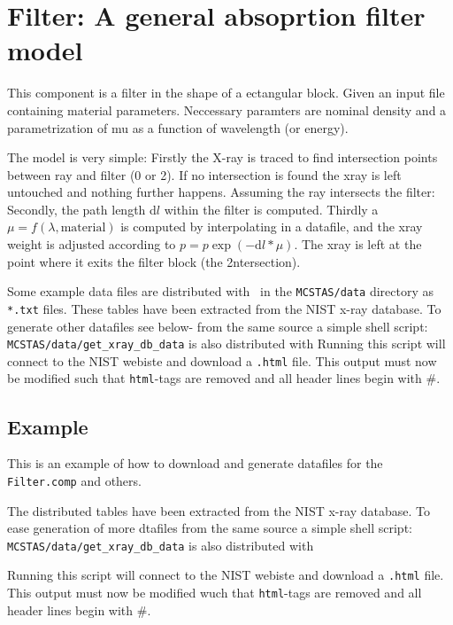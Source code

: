 \section{Filter: A general absoprtion filter model}
\label{filter}


This component is a filter in the shape of a ectangular block. Given an input file containing material parameters.
Neccessary paramters are nominal density and a parametrization of mu as a function of wavelength (or energy).

The model is very simple: Firstly the X-ray is traced to find intersection points between ray and filter (0 or 2).
If no intersection is found the xray is left untouched and nothing further happens.
Assuming the ray intersects the filter: Secondly, the path length d$l$ within the filter is computed.
Thirdly a $\mu = f(\lambda,\mathrm{material})$ is computed by interpolating in a datafile, and the xray weight is adjusted according to $p=p\exp(-\mathrm{d}l*\mu)$. The xray is left at the point where it exits the filter block (the 2\nd ntersection).

Some example data files are distributed with \MCX\ in the
\verb+MCSTAS/data+ directory as \verb+*.txt+ files. These tables have been extracted from the NIST x-ray database.
To generate other datafiles see below-
from the same source a simple shell script: \verb+MCSTAS/data/get_xray_db_data+ is also distributed with \MCX
Running this script will connect to the NIST webiste and download a \verb+.html+ file. This output must now be modified such that \verb+html+-tags
are removed and all header lines begin with #.

\subsection{Example}
\label{getNISTdata}
This is an example of how to download and generate datafiles for the \verb+Filter.comp+ and others.

The distributed tables have been extracted from the NIST x-ray database. To ease generation of more dtafiles
from the same source a simple shell script: \verb+MCSTAS/data/get_xray_db_data+ is also distributed with \MCX

Running this script will connect to the NIST webiste and download a \verb+.html+ file. This output must now be modified wuch that \verb+html+-tags
are removed and all header lines begin with #.

